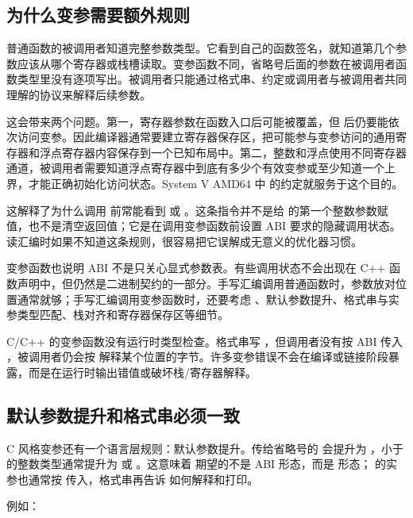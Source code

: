 \subsection{为什么变参需要额外规则}

普通函数的被调用者知道完整参数类型。它看到自己的函数签名，就知道第几个参数应该从哪个寄存器或栈槽读取。变参函数不同，省略号后面的参数在被调用者函数类型里没有逐项写出。被调用者只能通过格式串、约定或调用者与被调用者共同理解的协议来解释后续参数。

这会带来两个问题。第一，寄存器参数在函数入口后可能被覆盖，但  后仍要能依次访问变参。因此编译器通常要建立寄存器保存区，把可能参与变参访问的通用寄存器和浮点寄存器内容保存到一个已知布局中。第二，整数和浮点使用不同寄存器通道，被调用者需要知道浮点寄存器中到底有多少个有效变参或至少知道一个上界，才能正确初始化访问状态。System V AMD64 中  的约定就服务于这个目的。

这解释了为什么调用  前常能看到  或 。这条指令并不是给  的第一个整数参数赋值，也不是清空返回值；它是在调用变参函数前设置 ABI 要求的隐藏调用状态。读汇编时如果不知道这条规则，很容易把它误解成无意义的优化器习惯。

变参函数也说明 ABI 不是只关心显式参数表。有些调用状态不会出现在 C++ 函数声明中，但仍然是二进制契约的一部分。手写汇编调用普通函数时，参数放对位置通常就够；手写汇编调用变参函数时，还要考虑 、默认参数提升、格式串与实参类型匹配、栈对齐和寄存器保存区等细节。

\begin{warningbox}
C/C++ 的变参函数没有运行时类型检查。格式串写 ，但调用者没有按 ABI 传入 ，被调用者仍会按  解释某个位置的字节。许多变参错误不会在编译或链接阶段暴露，而是在运行时输出错值或破坏栈/寄存器解释。
\end{warningbox}

\subsection{默认参数提升和格式串必须一致}

C 风格变参还有一个语言层规则：默认参数提升。传给省略号的  会提升为 ，小于  的整数类型通常提升为  或 。这意味着  期望的不是  ABI 形态，而是  形态； 的实参也通常按  传入，格式串再告诉  如何解释和打印。

例如：


